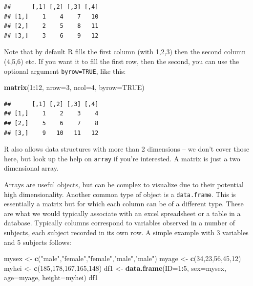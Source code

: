 \documentclass[]{book}
\newenvironment{Shaded}{\begin{snugshade}}{\end{snugshade}}
\newcommand{\KeywordTok}[1]{\textcolor[rgb]{0.13,0.29,0.53}{\textbf{#1}}}
\newcommand{\DataTypeTok}[1]{\textcolor[rgb]{0.13,0.29,0.53}{#1}}
\newcommand{\DecValTok}[1]{\textcolor[rgb]{0.00,0.00,0.81}{#1}}
\newcommand{\StringTok}[1]{\textcolor[rgb]{0.31,0.60,0.02}{#1}}
\newcommand{\OtherTok}[1]{\textcolor[rgb]{0.56,0.35,0.01}{#1}}
\newcommand{\OperatorTok}[1]{\textcolor[rgb]{0.81,0.36,0.00}{\textbf{#1}}}
\newcommand{\NormalTok}[1]{#1}
\theoremstyle{definition}
\theoremstyle{definition}
\theoremstyle{remark}
\begin{document}
\begin{verbatim}
##      [,1] [,2] [,3] [,4]
## [1,]    1    4    7   10
## [2,]    2    5    8   11
## [3,]    3    6    9   12
\end{verbatim}

Note that by default R fills the first column (with 1,2,3) then the
second column (4,5,6) etc. If you want it to fill the first row, then
the second, you can use the optional argument \texttt{byrow=TRUE}, like
this:

\begin{Shaded}
\begin{Highlighting}[]
\KeywordTok{matrix}\NormalTok{(}\DecValTok{1}\OperatorTok{:}\DecValTok{12}\NormalTok{, }\DataTypeTok{nrow=}\DecValTok{3}\NormalTok{, }\DataTypeTok{ncol=}\DecValTok{4}\NormalTok{, }\DataTypeTok{byrow=}\OtherTok{TRUE}\NormalTok{)}
\end{Highlighting}
\end{Shaded}

\begin{verbatim}
##      [,1] [,2] [,3] [,4]
## [1,]    1    2    3    4
## [2,]    5    6    7    8
## [3,]    9   10   11   12
\end{verbatim}

R also allows data structures with more than 2 dimensions -- we don't
cover those here, but look up the help on \texttt{array} if you're
interested. A matrix is just a two dimensional array.

Arrays are useful objects, but can be complex to visualize due to their
potential high dimensionality. Another common type of object is a
\texttt{data.frame}. This is essentially a matrix but for which each
column can be of a different type. These are what we would typically
associate with an excel spreadsheet or a table in a database. Typically
columns correspond to variables observed in a number of subjects, each
subject recorded in its own row. A simple example with 3 variables and 5
subjects follows:

\begin{Shaded}
\begin{Highlighting}[]
\NormalTok{mysex <-}\StringTok{ }\KeywordTok{c}\NormalTok{(}\StringTok{"male"}\NormalTok{,}\StringTok{"female"}\NormalTok{,}\StringTok{"female"}\NormalTok{,}\StringTok{"male"}\NormalTok{,}\StringTok{"male"}\NormalTok{)}
\NormalTok{myage <-}\StringTok{ }\KeywordTok{c}\NormalTok{(}\DecValTok{34}\NormalTok{,}\DecValTok{23}\NormalTok{,}\DecValTok{56}\NormalTok{,}\DecValTok{45}\NormalTok{,}\DecValTok{12}\NormalTok{)}
\NormalTok{myhei <-}\StringTok{ }\KeywordTok{c}\NormalTok{(}\DecValTok{185}\NormalTok{,}\DecValTok{178}\NormalTok{,}\DecValTok{167}\NormalTok{,}\DecValTok{165}\NormalTok{,}\DecValTok{148}\NormalTok{)}
\NormalTok{df1 <-}\StringTok{ }\KeywordTok{data.frame}\NormalTok{(}\DataTypeTok{ID=}\DecValTok{1}\OperatorTok{:}\DecValTok{5}\NormalTok{, }\DataTypeTok{sex=}\NormalTok{mysex, }\DataTypeTok{age=}\NormalTok{myage, }\DataTypeTok{height=}\NormalTok{myhei)}
\NormalTok{df1}
\end{Highlighting}
\end{Shaded}
\end{document}
